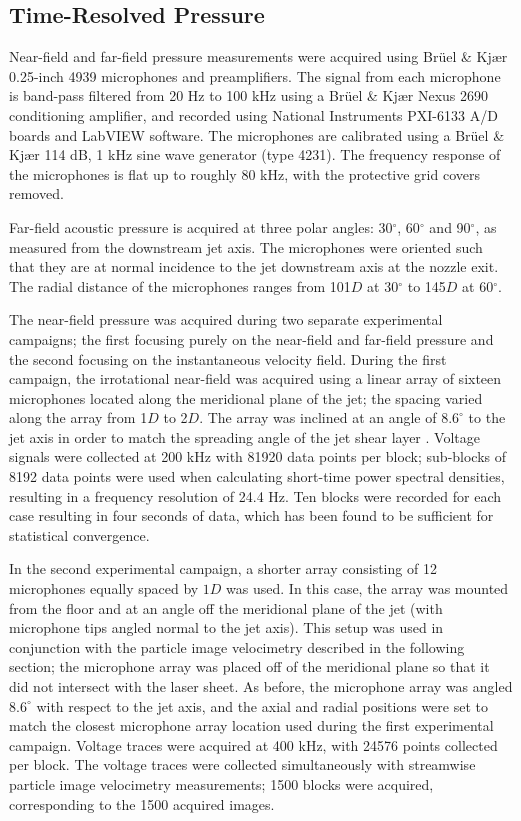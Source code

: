 \subsection{Time-Resolved Pressure}
\label{sect:NF_methodology}
Near-field and far-field pressure measurements were acquired using Br\"{u}el \& Kj\ae{}r 0.25-inch 4939 microphones and preamplifiers. 
The signal from each microphone is band-pass filtered from 20 Hz to 100 kHz using a Br\"{u}el \& Kj\ae{}r Nexus 2690 conditioning amplifier, and recorded using National Instruments PXI-6133 A/D boards and LabVIEW software. 
The microphones are calibrated using a Br\"{u}el \& Kj\ae{}r 114 dB, 1 kHz sine wave generator (type 4231). 
The frequency response of the microphones is flat up to roughly 80 kHz, with the protective grid covers removed. 

Far-field acoustic pressure is acquired at three polar angles: 30$^\circ$, 60$^\circ$ and 90$^\circ$, as measured from the downstream jet axis. 
The microphones were oriented such that they are at normal incidence to the jet downstream axis at the nozzle exit. 
The radial distance of the microphones ranges from 101$D$ at 30$^\circ$ to 145$D$ at 60$^\circ$. 

The near-field pressure was acquired  during two separate experimental campaigns; the first focusing purely on the near-field and far-field pressure and the second focusing on the instantaneous velocity field. 
During the first campaign, the irrotational near-field was acquired using a linear array of sixteen microphones located along the meridional plane of the jet; the spacing varied along the array from 1$D$ to 2$D$. 
The array was inclined at an angle of $8.6^\circ$ to the jet axis in order to match the spreading angle of the jet shear layer \citep{Kearney-Fischer2009}. 
Voltage signals were collected at 200 kHz with 81920 data points per block; sub-blocks of 8192 data points were used when calculating short-time power spectral densities, resulting in a frequency resolution of 24.4 Hz. 
Ten blocks were recorded for each case resulting in four seconds of data, which has been found to be sufficient for statistical convergence.

In the second experimental campaign, a shorter array consisting of 12 microphones equally spaced by $1D$ was used. 
In this case, the array was mounted from the floor and at an angle off the meridional plane of the jet (with microphone tips angled normal to the jet axis).
This setup was used in conjunction with the particle image velocimetry described in the following section; the microphone array was placed off of the meridional plane so that it did not intersect with the laser sheet. 
As before, the microphone array was angled $8.6^\circ$ with respect to the jet axis, and the axial and radial positions were set to match the closest microphone array location used during the first experimental campaign.
Voltage traces were acquired at 400 kHz, with 24576 points collected per block.
The voltage traces were collected simultaneously with streamwise particle image velocimetry measurements; 1500 blocks were acquired, corresponding to the 1500 acquired images.

